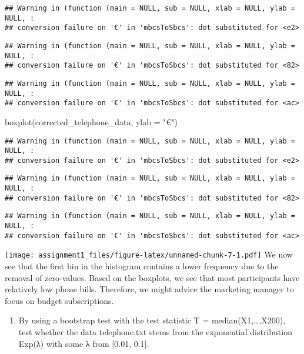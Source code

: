 \documentclass[
]{article}
\newenvironment{Shaded}{\begin{snugshade}}{\end{snugshade}}
\newcommand{\AttributeTok}[1]{\textcolor[rgb]{0.77,0.63,0.00}{#1}}
\newcommand{\FunctionTok}[1]{\textcolor[rgb]{0.00,0.00,0.00}{#1}}
\newcommand{\NormalTok}[1]{#1}
\newcommand{\StringTok}[1]{\textcolor[rgb]{0.31,0.60,0.02}{#1}}
\providecommand{\tightlist}{%
  \setlength{\itemsep}{0pt}\setlength{\parskip}{0pt}}
\begin{document}
\begin{verbatim}
## Warning in (function (main = NULL, sub = NULL, xlab = NULL, ylab = NULL, :
## conversion failure on '€' in 'mbcsToSbcs': dot substituted for <e2>
\end{verbatim}

\begin{verbatim}
## Warning in (function (main = NULL, sub = NULL, xlab = NULL, ylab = NULL, :
## conversion failure on '€' in 'mbcsToSbcs': dot substituted for <82>
\end{verbatim}

\begin{verbatim}
## Warning in (function (main = NULL, sub = NULL, xlab = NULL, ylab = NULL, :
## conversion failure on '€' in 'mbcsToSbcs': dot substituted for <ac>
\end{verbatim}

\begin{Shaded}
\begin{Highlighting}[]
\FunctionTok{boxplot}\NormalTok{(corrected\_telephone\_data, }\AttributeTok{ylab =} \StringTok{"€"}\NormalTok{)}
\end{Highlighting}
\end{Shaded}

\begin{verbatim}
## Warning in (function (main = NULL, sub = NULL, xlab = NULL, ylab = NULL, :
## conversion failure on '€' in 'mbcsToSbcs': dot substituted for <e2>
\end{verbatim}

\begin{verbatim}
## Warning in (function (main = NULL, sub = NULL, xlab = NULL, ylab = NULL, :
## conversion failure on '€' in 'mbcsToSbcs': dot substituted for <82>
\end{verbatim}

\begin{verbatim}
## Warning in (function (main = NULL, sub = NULL, xlab = NULL, ylab = NULL, :
## conversion failure on '€' in 'mbcsToSbcs': dot substituted for <ac>
\end{verbatim}

\texttt{[image: assignment1\_files/figure-latex/unnamed-chunk-7-1.pdf]}
We now see that the first bin in the histogram contains a lower
frequency due to the removal of zero-values. Based on the boxplots, we
see that most participants have relatively low phone bills. Therefore,
we might advice the marketing manager to focus on budget subscriptions.

\begin{enumerate}
\def\labelenumi{\alph{enumi})}
\setcounter{enumi}{1}
\tightlist
\item
  By using a bootstrap test with the test statistic T =
  median(X1,\ldots,X200), test whether the data telephone.txt stems from
  the exponential distribution Exp(λ) with some λ from {[}0.01, 0.1{]}.
\end{enumerate}
\end{document}
